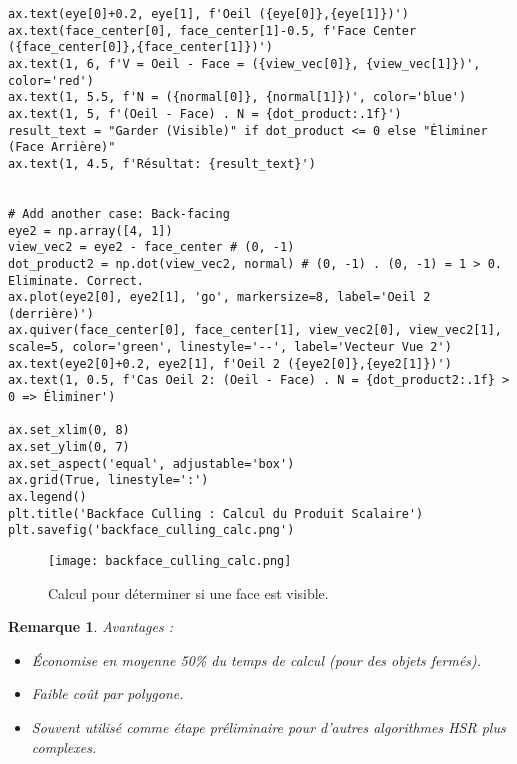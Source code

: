 \documentclass{article}
\newtheorem{remark}{Remarque}
\begin{document}
{\begin{verbatim}
ax.text(eye[0]+0.2, eye[1], f'Oeil ({eye[0]},{eye[1]})')
ax.text(face_center[0], face_center[1]-0.5, f'Face Center ({face_center[0]},{face_center[1]})')
ax.text(1, 6, f'V = Oeil - Face = ({view_vec[0]}, {view_vec[1]})', color='red')
ax.text(1, 5.5, f'N = ({normal[0]}, {normal[1]})', color='blue')
ax.text(1, 5, f'(Oeil - Face) . N = {dot_product:.1f}')
result_text = "Garder (Visible)" if dot_product <= 0 else "Éliminer (Face Arrière)"
ax.text(1, 4.5, f'Résultat: {result_text}')


# Add another case: Back-facing
eye2 = np.array([4, 1])
view_vec2 = eye2 - face_center # (0, -1)
dot_product2 = np.dot(view_vec2, normal) # (0, -1) . (0, -1) = 1 > 0. Eliminate. Correct.
ax.plot(eye2[0], eye2[1], 'go', markersize=8, label='Oeil 2 (derrière)')
ax.quiver(face_center[0], face_center[1], view_vec2[0], view_vec2[1], scale=5, color='green', linestyle='--', label='Vecteur Vue 2')
ax.text(eye2[0]+0.2, eye2[1], f'Oeil 2 ({eye2[0]},{eye2[1]})')
ax.text(1, 0.5, f'Cas Oeil 2: (Oeil - Face) . N = {dot_product2:.1f} > 0 => Éliminer')

ax.set_xlim(0, 8)
ax.set_ylim(0, 7)
ax.set_aspect('equal', adjustable='box')
ax.grid(True, linestyle=':')
ax.legend()
plt.title('Backface Culling : Calcul du Produit Scalaire')
plt.savefig('backface_culling_calc.png')
\end{verbatim}

\begin{figure}[H]
\centering
\texttt{[image: backface\_culling\_calc.png]}
\caption{Calcul pour déterminer si une face est visible.}
\label{fig:backface_culling_calc}
\end{figure}

\begin{remark}
Avantages :
\begin{itemize}
    \item Économise en moyenne 50\% du temps de calcul (pour des objets fermés).
    \item Faible coût par polygone.
    \item Souvent utilisé comme étape préliminaire pour d'autres algorithmes HSR plus complexes.
\end{itemize}
\end{remark}

}
\end{document}
